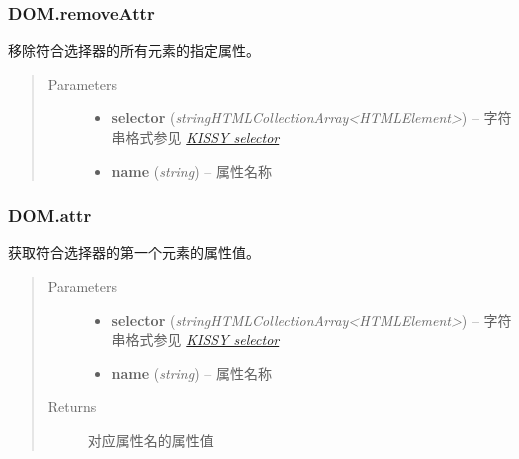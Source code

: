 \documentclass[letterpaper,10pt,english]{sphinxmanual}
\begin{document}
\subsubsection{DOM.removeAttr}
\label{api/core/dom/removeAttr::doc}\label{api/core/dom/removeAttr:dom-removeattr}

\begin{fulllineitems}
\label{api/core/dom/removeAttr:DOM.removeAttr}
移除符合选择器的所有元素的指定属性。
\begin{quote}\begin{description}
\item[{Parameters}] \leavevmode\begin{itemize}
\item {}
\textbf{selector} (\emph{string\textbar{}HTMLCollection\textbar{}Array\textless{}HTMLElement\textgreater{}}) -- 字符串格式参见 {\hyperref[api/core/dom/selector:dom-selector]{\emph{KISSY selector}}}

\item {}
\textbf{name} (\emph{string}) -- 属性名称

\end{itemize}

\end{description}\end{quote}

\end{fulllineitems}



\subsubsection{DOM.attr}
\label{api/core/dom/attr:dom-attr}\label{api/core/dom/attr::doc}

\begin{fulllineitems}
\label{api/core/dom/attr:DOM.attr}
获取符合选择器的第一个元素的属性值。
\begin{quote}\begin{description}
\item[{Parameters}] \leavevmode\begin{itemize}
\item {}
\textbf{selector} (\emph{string\textbar{}HTMLCollection\textbar{}Array\textless{}HTMLElement\textgreater{}}) -- 字符串格式参见 {\hyperref[api/core/dom/selector:dom-selector]{\emph{KISSY selector}}}

\item {}
\textbf{name} (\emph{string}) -- 属性名称

\end{itemize}

\item[{Returns}] \leavevmode
对应属性名的属性值

\end{description}\end{quote}

\end{fulllineitems}
\end{document}
